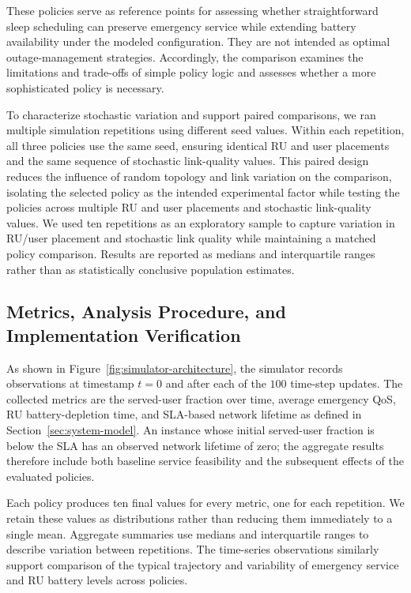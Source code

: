 These policies serve as reference points for assessing whether straightforward sleep scheduling can preserve emergency service while extending battery availability under the modeled configuration. They are not intended as optimal outage-management strategies. Accordingly, the comparison examines the limitations and trade-offs of simple policy logic and assesses whether a more sophisticated policy is necessary.

To characterize stochastic variation and support paired comparisons, we ran multiple simulation repetitions using different seed values. Within each repetition, all three policies use the same seed, ensuring identical RU and user placements and the same sequence of stochastic link-quality values. This paired design reduces the influence of random topology and link variation on the comparison, isolating the selected policy as the intended experimental factor while testing the policies across multiple RU and user placements and stochastic link-quality values. We used ten repetitions as an exploratory sample to capture variation in RU/user placement and stochastic link quality while maintaining a matched policy comparison. Results are reported as medians and interquartile ranges rather than as statistically conclusive population estimates.

\subsection{Metrics, Analysis Procedure, and Implementation Verification}
\label{subsec:metrics-analysis}

As shown in Figure~\ref{fig:simulator-architecture}, the simulator records observations at timestamp \(t=0\) and after each of the \(100\) time-step updates. The collected metrics are the served-user fraction over time, average emergency QoS, RU battery-depletion time, and SLA-based network lifetime as defined in Section~\ref{sec:system-model}. An instance whose initial served-user fraction is below the SLA has an observed network lifetime of zero; the aggregate results therefore include both baseline service feasibility and the subsequent effects of the evaluated policies.

Each policy produces ten final values for every metric, one for each repetition. We retain these values as distributions rather than reducing them immediately to a single mean. Aggregate summaries use medians and interquartile ranges to describe variation between repetitions. The time-series observations similarly support comparison of the typical trajectory and variability of emergency service and RU battery levels across policies.

